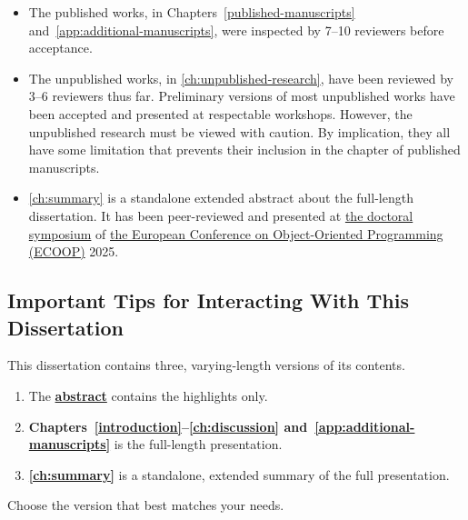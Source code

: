 \begin{itemize}

\item The published works, in Chapters~\ref{published-manuscripts}
and~\ref{app:additional-manuscripts}, were inspected by 7--10 reviewers before
acceptance.

\item The unpublished works, in \autoref{ch:unpublished-research}, have been
reviewed by 3--6 reviewers thus far. Preliminary versions of most unpublished
works have been accepted and presented at respectable workshops. However, the
unpublished research must be viewed with caution. By implication, they all have
some limitation that prevents their inclusion in the chapter of {published}
manuscripts.

\item \autoref{ch:summary} is a standalone extended abstract about the
full-length dissertation. It has been peer-reviewed and presented at
\href{https://2025.ecoop.org/track/ecoop-2025-doctoral-symposium}{the doctoral
symposium} of \href{https://2025.ecoop.org}{the European Conference on
Object-Oriented Programming (ECOOP)} 2025.

\end{itemize}



\subsection{Important Tips for Interacting With This Dissertation}
\label{subsec:tips}

This dissertation contains three, varying-length versions of its contents.

\begin{mdframed}[backgroundcolor=paperbase,linecolor=paper,nobreak=true]
\begin{enumerate}[wide, labelwidth=!, labelindent=0pt]
\item The \textbf{\hyperref[abs]{abstract}} contains the highlights only.
\item \textbf{Chapters~\ref{introduction}--\ref{ch:discussion}
and~\ref{app:additional-manuscripts}} is the full-length presentation.
\item \textbf{\autoref{ch:summary}} is a standalone, extended summary of the
full presentation.
\end{enumerate}
\end{mdframed}

Choose the version that best matches your needs.

